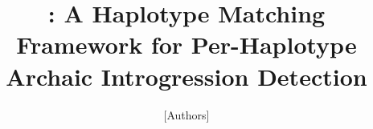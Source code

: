\documentclass[12pt]{article}
\title{\AP: A Haplotype Matching Framework for Per-Haplotype Archaic Introgression Detection}
\author{[Authors]}
\date{}
\begin{document}
\maketitle
\linenumbers















\clearpage
\appendix

\end{document}
